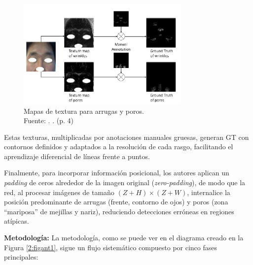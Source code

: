 \begin{figure}[H]
	\begin{center}
		\includegraphics[width=0.75\textwidth]{2/figures/mapsant1.png}
		\caption[Mapas de textura para arrugas y poros]{Mapas de textura para arrugas y poros.\\
		Fuente: \cite{yoon2023}. . (p. 4)}
		\label{2:figmapant1}
	\end{center}
\end{figure}

Estas texturas, multiplicadas por anotaciones manuales gruesas, generan GT con contornos definidos y adaptados a la resolución de cada rasgo, facilitando el aprendizaje diferencial de líneas frente a puntos.

Finalmente, para incorporar información posicional, los autores aplican un \textit{padding} de ceros alrededor de la imagen original (\textit{zero-padding}), de modo que la red, al procesar imágenes de tamaño $(Z+H) \times (Z+W)$, internalice la posición predominante de arrugas (frente, contorno de ojos) y poros (zona “mariposa” de mejillas y nariz), reduciendo detecciones erróneas en regiones atípicas.

\textbf{Metodología:}
La metodología, como se puede ver en el diagrama creado en la Figura \ref{2:figant1}, sigue un flujo sistemático compuesto por cinco fases principales:

